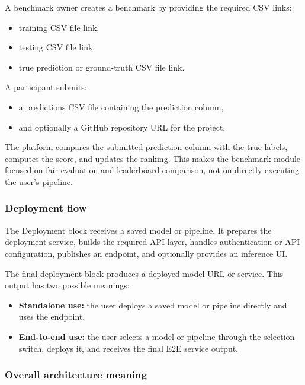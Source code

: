 \documentclass[12pt,a4paper]{report}
\begin{document}
A benchmark owner creates a benchmark by providing the required CSV links:

\begin{itemize}
  \item training CSV file link,
  \item testing CSV file link,
  \item true prediction or ground-truth CSV file link.
\end{itemize}

A participant submits:

\begin{itemize}
  \item a predictions CSV file containing the prediction column,
  \item and optionally a GitHub repository URL for the project.
\end{itemize}

The platform compares the submitted prediction column with the true labels,
computes the score, and updates the ranking. This makes the benchmark module
focused on fair evaluation and leaderboard comparison, not on directly executing
the user's pipeline.

\subsubsection*{Deployment flow}

The Deployment block receives a saved model or pipeline. It prepares the
deployment service, builds the required API layer, handles authentication or API
configuration, publishes an endpoint, and optionally provides an inference UI.

The final deployment block produces a deployed model URL or service. This output
has two possible meanings:

\begin{itemize}
  \item \textbf{Standalone use:} the user deploys a saved model or pipeline
  directly and uses the endpoint.
  \item \textbf{End-to-end use:} the user selects a model or pipeline through the
  selection switch, deploys it, and receives the final E2E service output.
\end{itemize}

\subsubsection*{Overall architecture meaning}
\end{document}
